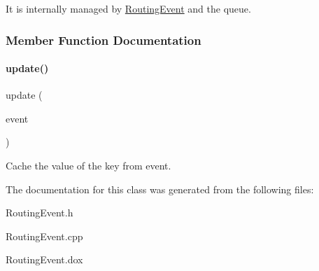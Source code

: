 It is internally managed by \hyperlink{classKite_1_1RoutingEvent}{Routing\+Event} and the queue. 

\subsubsection{Member Function Documentation}
\mbox{\label{classKite_1_1RoutingEvent_1_1Key_a398c66b87a5575dba86c92c7fad4a857}} 
\paragraph{\texorpdfstring{update()}{update()}}
{\footnotesize\ttfamily update (\begin{DoxyParamCaption}\item[{const \hyperlink{classKite_1_1RoutingEvent}{Routing\+Event} $\ast$}]{event }\end{DoxyParamCaption})}

Cache the value of the key from {\ttfamily event}. 

The documentation for this class was generated from the following files\+:\begin{DoxyCompactItemize}
\item 
Routing\+Event.\+h\item 
Routing\+Event.\+cpp\item 
Routing\+Event.\+dox\end{DoxyCompactItemize}
